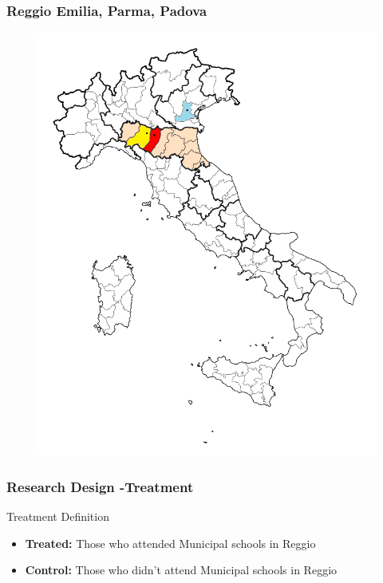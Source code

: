 \begin{frame}
\frametitle{Reggio Emilia, Parma, Padova} 
\begin{center}
\begin{figure}
\includegraphics[height=1.0\textheight]{include/3-cities-map.png}
\end{figure}
\end{center}
\end{frame}
\begin{frame}
\frametitle{Research Design -Treatment} 
\begin{block}{Treatment Definition}
\begin{itemize}
\item \textbf{Treated:} Those who attended Municipal schools in Reggio
\item \textbf{Control:} Those who didn't attend Municipal schools in Reggio

\end{itemize}
\end{block}

\end{frame}

